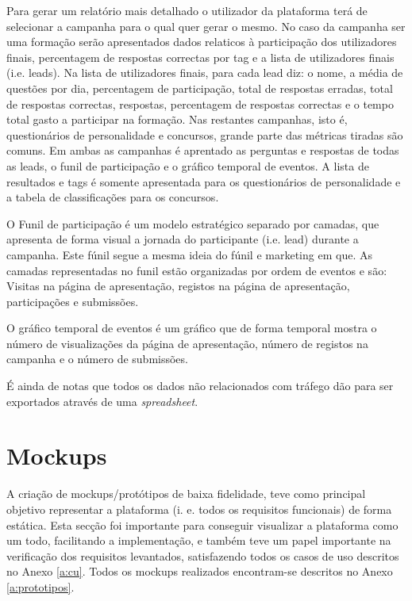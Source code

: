 Para gerar um relatório mais detalhado o utilizador da plataforma terá de selecionar a campanha para o qual quer gerar o mesmo. No caso da campanha ser uma formação serão apresentados dados relaticos à participação dos utilizadores finais, percentagem de respostas correctas por tag e a lista de utilizadores finais (i.e. leads). Na lista de utilizadores finais, para cada lead diz: o nome, a média de questões por dia, percentagem de participação, total de respostas erradas, total de respostas correctas, respostas, percentagem de respostas correctas e o tempo total gasto a participar na formação. 
Nas restantes campanhas, isto é, questionários de personalidade e concursos, grande parte das métricas tiradas são comuns. Em ambas as campanhas é aprentado as perguntas e respostas de todas as leads, o funil de participação e o gráfico temporal de eventos. A lista de resultados e tags é somente apresentada para os questionários de personalidade e a tabela de classificações para os concursos. 

O Funil de participação é um modelo estratégico separado por camadas, que apresenta de forma visual a jornada do participante (i.e. lead) durante a campanha. Este fúnil segue a mesma ideia do fúnil e marketing\cite{f8}\cite{f9} em que. As camadas representadas no funil estão organizadas por ordem de eventos e são: Visitas na página de apresentação, registos na página de apresentação, participações e submissões.

O gráfico temporal de eventos é um gráfico que de forma temporal mostra o número de visualizações da página de apresentação, número de registos na campanha e o número de submissões.

É ainda de notas que todos os dados não relacionados com tráfego dão para ser exportados através de uma \textit{spreadsheet}.


\section{Mockups}
\label{prototipagem}

A criação de mockups/protótipos de baixa fidelidade, teve como principal objetivo representar a plataforma (i. e. todos os requisitos funcionais) de forma estática. Esta secção foi importante para conseguir visualizar a plataforma como um todo, facilitando a implementação, e também teve um papel importante na verificação dos requisitos levantados, satisfazendo todos os casos de uso descritos no Anexo \ref{a:cu}. Todos os mockups realizados encontram-se descritos no Anexo \ref{a:prototipos}.


\blankpage

\glsresetall